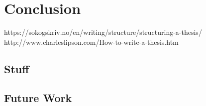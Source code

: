 %
\chapter{Conclusion}
\label{sec:conclusion}



https://sokogskriv.no/en/writing/structure/structuring-a-thesis/
http://www.charleslipson.com/How-to-write-a-thesis.htm

\section{Stuff}
\label{sec:conclusion:sec1}


\section{Future Work}
\label{sec:conclusion:future}

